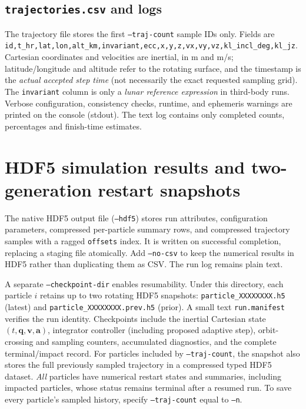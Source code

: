 \documentclass[11pt,a4paper]{article}
\newcommand{\opt}[1]{\texttt{#1}}
\newcommand{\pathcode}[1]{\nolinkurl{#1}}
\begin{document}
\subsection{\pathcode{trajectories.csv} and logs}
The trajectory file stores the first \opt{--traj-count} sample IDs only. Fields are \pathcode{id,t_hr,lat,lon,alt_km,invariant,ecc,x,y,z,vx,vy,vz,kl_incl_deg,kl_jz}. Cartesian coordinates and velocities are inertial, in m and m/s; latitude/longitude and altitude refer to the rotating surface, and the timestamp is the \emph{actual accepted step time} (not necessarily the exact requested sampling grid). The \pathcode{invariant} column is only a \emph{lunar reference expression} in third-body runs. Verbose configuration, consistency checks, runtime, and ephemeris warnings are printed on the console (stdout). The text log contains only completed counts, percentages and finish-time estimates.

\section{HDF5 simulation results and two-generation restart snapshots}
\label{sec:hdf5_restart}
The native HDF5 output file (\opt{--hdf5}) stores run attributes,
configuration parameters, compressed per-particle summary rows, and compressed
trajectory samples with a ragged \pathcode{offsets} index. It is written on
successful completion, replacing a staging file atomically. Add \opt{--no-csv}
to keep the numerical results in HDF5 rather than duplicating them as CSV.
The run log remains plain text.

A separate \opt{--checkpoint-dir} enables resumability. Under this directory,
each particle \(i\) retains up to two rotating HDF5 snapshots:
\pathcode{particle_XXXXXXXX.h5} (latest) and
\pathcode{particle_XXXXXXXX.prev.h5} (prior). A small text
\pathcode{run.manifest} verifies the run identity. Checkpoints include the
inertial Cartesian state \((t,\mathbf q,\mathbf v,\mathbf a)\), integrator
controller (including proposed adaptive step), orbit-crossing and sampling
counters, accumulated diagnostics, and the complete terminal/impact record.
For particles included by \opt{--traj-count}, the snapshot also stores the
full previously sampled trajectory in a compressed typed HDF5 dataset.
\emph{All} particles have numerical restart states and summaries, including
impacted particles, whose status remains terminal after a resumed run.
To save every particle's sampled history, specify \opt{--traj-count} equal to
\opt{--n}.
\end{document}
